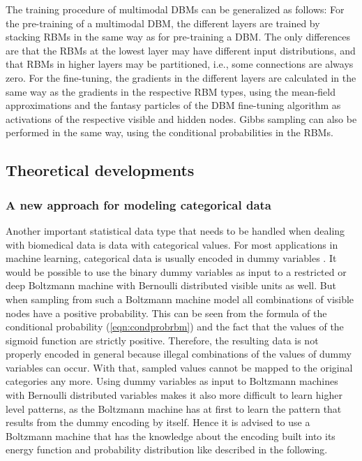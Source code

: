 \documentclass[12pt]{article}
\begin{document}
The training procedure of multimodal DBMs can be generalized as follows:
For the pre-training of a multimodal DBM, the different layers are trained by stacking RBMs in the same way as for pre-training a DBM.
The only differences are that the RBMs at the lowest layer may have different input distributions, and that RBMs in higher layers may be partitioned, i.e., some connections are always zero.
For the fine-tuning, the gradients in the different layers are calculated in the same way as the gradients in the respective RBM types, using the mean-field approximations and the fantasy particles of the DBM fine-tuning algorithm as activations of the respective visible and hidden nodes.
Gibbs sampling can also be performed in the same way, using the conditional probabilities in the RBMs.


\subsection{Theoretical developments}\label{bmaddtheory}

\subsubsection{A new approach for modeling categorical data}\label{methodsoftmax0}
Another important statistical data type that needs to be handled when dealing with biomedical data is data with categorical values.
For most applications in machine learning, categorical data is usually encoded in dummy variables \citep{hastie_elements}.
It would be possible to use the binary dummy variables as input to a restricted or deep Boltzmann machine with Bernoulli distributed visible units as well.
But when sampling from such a Boltzmann machine model all combinations of visible nodes have a positive probability. This can be seen from the formula of the conditional probability (\ref{eqn:condprobrbm}) and the fact that the values of the sigmoid function are strictly positive.
Therefore, the resulting data is not properly encoded in general  because illegal combinations of the values of dummy variables can occur. With that, sampled values cannot be mapped to the original categories any more.
Using dummy variables as input to Boltzmann machines with Bernoulli distributed variables makes it also more difficult to learn higher level patterns, as the Boltzmann machine has at first to learn the pattern that results from the dummy encoding  by itself. Hence it is advised to use a Boltzmann machine that has the knowledge about the encoding built into its energy function and probability distribution like described in the following.
\end{document}
